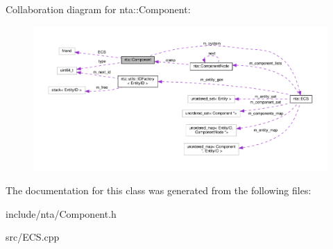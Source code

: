 Collaboration diagram for nta\+:\+:Component\+:\nopagebreak
\begin{figure}[H]
\begin{center}
\leavevmode
\includegraphics[width=350pt]{d2/de4/classnta_1_1Component__coll__graph}
\end{center}
\end{figure}


The documentation for this class was generated from the following files\+:\begin{DoxyCompactItemize}
\item 
include/nta/Component.\+h\item 
src/E\+C\+S.\+cpp\end{DoxyCompactItemize}
